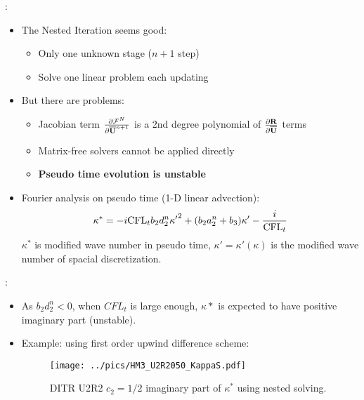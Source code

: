 \documentclass[aspectratio=169,serif]{beamer} %
\begin{document}
\begin{frame}{\secname: \subsecname}
  \begin{itemize}
    \item The Nested Iteration seems good:
          \begin{itemize}
            \item Only one unknown stage ($n+1$ step)
            \item Solve one linear problem each updating
          \end{itemize}
    \item But there are problems:
          \begin{itemize}
            \item Jacobian term $\pdv{\mathcal{F}^N}{\overline{\mathbf{U}}^{n+1}}$
                  is a 2nd degree polynomial of $\pdv{\mathbf{R}}{\overline{\mathbf{U}}}$ terms
            \item Matrix-free solvers cannot be applied directly
            \item {\bf Pseudo time evolution is unstable}
          \end{itemize}
    \item Fourier analysis on pseudo time (1-D linear advection):
          \begin{equation}
            \begin{aligned}
              \kappa^* =
              -i\text{CFL}_t b_2 d_2^n {\kappa'}^2
              + (b_2a_2^n + b_3) \kappa' - \frac{i}{\text{CFL}_t}
            \end{aligned}
            \label{eq:imagKsTauDITR_General}
          \end{equation}
          $\kappa^*$ is modified wave number in pseudo time, $\kappa'=\kappa'(\kappa)$
          is the modified wave number of spacial discretization.
  \end{itemize}
\end{frame}

\begin{frame}{\secname: \subsecname}
  \begin{itemize}
    \item As $b_2d_2^n < 0$, when $CFL_t$ is large enough,
          $\kappa*$ is expected to have positive imaginary part (unstable).
    \item Example: using first order upwind difference scheme:
          \begin{figure}[htbp]
            \centering
            \texttt{[image: ../pics/HM3\_U2R2050\_KappaS.pdf]}
            \caption[]{DITR U2R2 $c_2=1/2$ imaginary part of $\kappa^*$ using
              nested solving.}
            \label{fig:HM3_U2R2050_KappaS}
          \end{figure}
  \end{itemize}
\end{frame}
\end{document}
